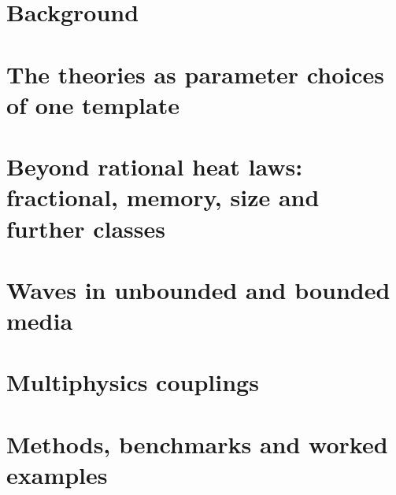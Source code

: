 \documentclass[12pt,a4paper]{article}
\begin{document}
\section{Background}\label{sec:part_foundations}
\demoteopen

\demoteclose
\demoteopen





\demoteclose

\section{The theories as parameter choices of one template}\label{sec:part_theories}
\demoteopen




\demoteclose

\section{Beyond rational heat laws: fractional, memory, size and further classes}\label{sec:part_beyond}
\demoteopen




\demoteclose

\section{Waves in unbounded and bounded media}\label{sec:part_waves}
\demoteopen











\demoteclose

\section{Multiphysics couplings}\label{sec:part_fields}
\demoteopen


\demoteclose

\section{Methods, benchmarks and worked examples}\label{sec:part_methods}
\demoteopen



\demoteclose
\end{document}

